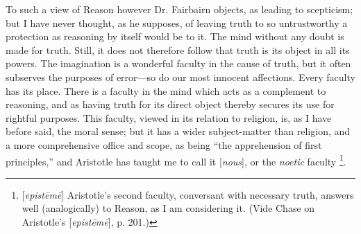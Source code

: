 To such a view of Reason however Dr. Fairbairn
objects, as leading to scepticism; but I have never thought, as he
supposes, of leaving truth to so untrustworthy a protection as
reasoning by itself would be to it. The mind without any doubt is made
for truth. Still, it does not therefore follow that truth is its
object in all its powers. The imagination is a wonderful faculty
in the cause of truth, but it often subserves the purposes of
error—so do our most innocent affections. Every faculty has its
place. There is a faculty in the mind which acts as a complement to
reasoning, and as having truth for its direct object thereby secures
its use for rightful purposes. This faculty, viewed in its relation to
religion, is, as I have before said, the moral sense; but it has a
wider subject-matter than religion, and a more comprehensive office
and scope, as being ``the apprehension of first principles,'' and
Aristotle has taught me to call it [\emph{nous}], or the \emph{noetic}
faculty \footnote{[\emph{epist\={e}m\={e}}]
Aristotle's second faculty, conversant with necessary truth, answers
well (analogically) to Reason, as I am considering it. (Vide Chase on
Aristotle's [\emph{epist\={e}m\={e}}], p. 201.)}.


